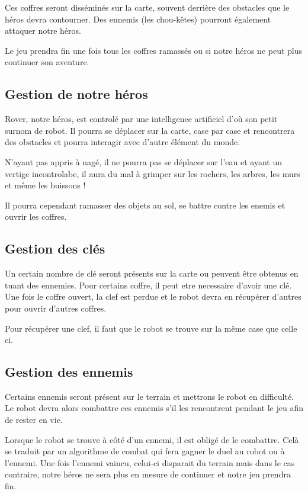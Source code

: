 \documentclass[a4paper 12pts]{article}
\begin{document}
Ces coffres seront disséminés sur la carte, souvent derrière des obstacles que le héros devra contourner. 
Des ennemis (les chou-kêtes) pourront également attaquer notre héros.

Le jeu prendra fin une fois tous les coffres ramassés ou si notre héros ne peut plus continuer son aventure.


\subsection{Gestion de notre héros}

Rover, notre héros, est controlé par une intelligence artificiel d'où son petit surnom de robot.
Il pourra se déplacer sur la carte, case par case et rencontrera des obstacles et pourra interagir avec d'autre élément du monde.

N'ayant pas appris à nagé, il ne pourra pas se déplacer sur l'eau et ayant un vertige incontrolabe, il aura du mal à grimper sur les rochers,
les arbres, les murs et même les buissons !

Il pourra cependant ramasser des objets au sol, se battre contre les enemis et ouvrir les coffres. 

\subsection{Gestion des clés}


Un certain nombre de clé seront présents sur la carte ou peuvent être obtenus en tuant des ennemies.
Pour certains coffre, il peut etre necessaire d'avoir une clé. 
Une fois le coffre ouvert, la clef est perdue et le robot devra en récupérer d'autres pour ouvrir d'autres coffres.

Pour récupérer une clef, il faut que le robot se trouve sur la même case que celle ci.

\subsection{Gestion des ennemis}

Certains ennemis seront présent sur le terrain et mettrons le robot en difficulté. 
Le robot devra alors combattre ces ennemis s'il les rencontrent pendant le jeu afin de rester en vie.

Lorsque le robot se trouve à côté d'un ennemi, il est obligé de le combattre. Celà se traduit par un algorithme de combat qui fera gagner le duel au robot ou à l'ennemi. Une fois l'ennemi vaincu, celui-ci disparait du terrain mais dans le cas contraire, notre héros ne sera plus en mesure de continuer et notre jeu prendra fin.
\end{document}
